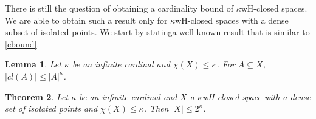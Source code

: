 \documentclass[11pt]{amsart}
\newif\ifdraft\draftfalse
\newtheorem{theorem}{Theorem}[section]
\newtheorem{lemma}[theorem]{Lemma}
\theoremstyle{definition}
\theoremstyle{remark}
\numberwithin{equation}{section}
\begin{document}
There is still the question of obtaining a cardinality bound of $\kappa$wH-closed spaces.  We are able to obtain such a result only for $\kappa$wH-closed spaces with a dense subset of isolated points. We start by statinga well-known result that is similar to \ref{cbound}.

\begin{lemma}{{\immediate{}}{\ifdraft\hspace{-\lastskip}\vadjust{\vspace{-1mm}\smash{\llap{{\tt {{clk}}}\hspace{8mm}}}\vspace{1mm}}\fi}} Let $\kappa$ be an infinite cardinal and $\chi(X) \leq \kappa$.  For $A \subseteq X$, $|cl(A)| \leq |A|^{\kappa}$.
\end{lemma}

\begin{theorem}{{\immediate{}}{\ifdraft\hspace{-\lastskip}\vadjust{\vspace{-1mm}\smash{\llap{{\tt {{kwHclosedDense}}}\hspace{8mm}}}\vspace{1mm}}\fi}}
Let $\kappa$ be an infinite cardinal and  $X$ a $\kappa$wH-closed space with a dense set of isolated points and $\chi(X) \leq \kappa$.   
Then $|X| \leq 2^{\kappa}$.
\end{theorem}
\end{document}
